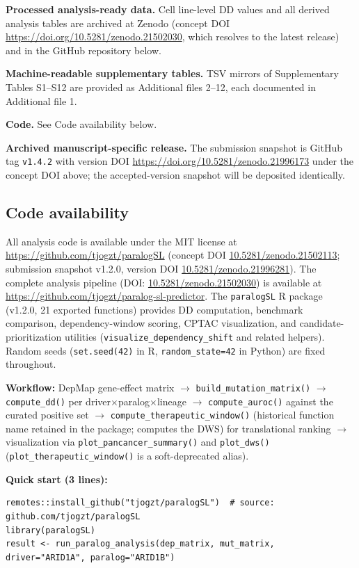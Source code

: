 \documentclass[11pt,a4paper]{article}
\begin{document}
\noindent\textbf{Processed analysis-ready data.} Cell line-level DD values and all derived analysis tables are archived at Zenodo (concept DOI \url{https://doi.org/10.5281/zenodo.21502030}, which resolves to the latest release) and in the GitHub repository below.

\noindent\textbf{Machine-readable supplementary tables.} TSV mirrors of Supplementary Tables S1--S12 are provided as Additional files 2--12, each documented in Additional file 1.

\noindent\textbf{Code.} See Code availability below.

\noindent\textbf{Archived manuscript-specific release.} The submission snapshot is GitHub tag \texttt{v1.4.2} with version DOI \url{https://doi.org/10.5281/zenodo.21996173} under the concept DOI above; the accepted-version snapshot will be deposited identically.

\subsection*{Code availability}
All analysis code is available under the MIT license at \url{https://github.com/tjogzt/paralogSL} (concept DOI \href{https://doi.org/10.5281/zenodo.21502113}{10.5281/zenodo.21502113}; submission snapshot v1.2.0, version DOI \href{https://doi.org/10.5281/zenodo.21996281}{10.5281/zenodo.21996281}). The complete analysis pipeline (DOI: \href{https://doi.org/10.5281/zenodo.21502030}{10.5281/zenodo.21502030}) is available at \url{https://github.com/tjogzt/paralog-sl-predictor}. The \texttt{paralogSL} R package (v1.2.0, 21 exported functions) provides DD computation, benchmark comparison, dependency-window scoring, CPTAC visualization, and candidate-prioritization utilities (\texttt{visualize\_dependency\_shift} and related helpers). Random seeds (\texttt{set.seed(42)} in R, \texttt{random\_state=42} in Python) are fixed throughout.

\noindent\textbf{Workflow:} DepMap gene-effect matrix $\rightarrow$ \texttt{build\_mutation\_matrix()} $\rightarrow$ \texttt{compute\_dd()} per driver$\times$paralog$\times$lineage $\rightarrow$ \texttt{compute\_auroc()} against the curated positive set $\rightarrow$ \texttt{compute\_therapeutic\_window()} (historical function name retained in the package; computes the DWS) for translational ranking $\rightarrow$ visualization via \texttt{plot\_pancancer\_summary()} and \texttt{plot\_dws()} (\texttt{plot\_therapeutic\_window()} is a soft-deprecated alias).

\noindent\textbf{Quick start (3 lines):}
\begin{verbatim}
remotes::install_github("tjogzt/paralogSL")  # source: github.com/tjogzt/paralogSL
library(paralogSL)
result <- run_paralog_analysis(dep_matrix, mut_matrix, driver="ARID1A", paralog="ARID1B")
\end{verbatim}
\end{document}
